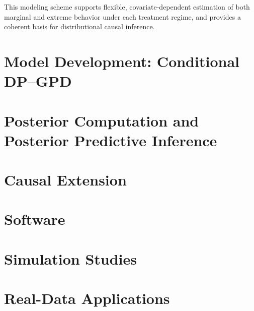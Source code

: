 \documentclass[article]{jss}\usepackage[]{graphicx}\usepackage[]{xcolor}
\begin{document}
This modeling scheme supports flexible, covariate-dependent estimation of both marginal and extreme behavior under each treatment regime, and provides a coherent basis for distributional causal inference.


\section{Model Development: Conditional DP--GPD}
\label{sec:model}

\section{Posterior Computation and Posterior Predictive Inference}
\label{sec:posterior}

\section{Causal Extension}
\label{sec:causal}

\section{Software}
\label{sec:software}

\section{Simulation Studies}

\section{Real-Data Applications}

\end{document}
